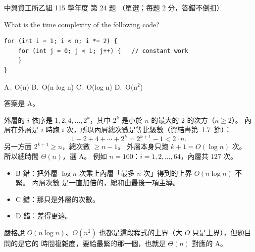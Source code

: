 \begin{pastexam}[label={px:nchu-115-is-24}]{中興資工所乙組 115 學年度 第 24 題}
（單選；每題 2 分，答錯不倒扣）

What is the time complexity of the following code?
\begin{verbatim}
for (int i = 1; i < n; i *= 2) {
    for (int j = 0; j < i; j++) {   // constant work
    }
}
\end{verbatim}
A.~O(n) \qquad B.~O(n log n) \qquad C.~O(log n) \qquad D.~O(n$^2$)
\end{pastexam}

\begin{pastsoln}
答案是 A。

外層的 $i$ 依序是 $1, 2, 4, \ldots, 2^k$，其中 $2^k$ 是小於 $n$ 的最大的 $2$ 的次方（$n \ge 2$）。
內層在外層是 $i$ 時跑 $i$ 次，所以內層總次數是等比級數（資結書第~1.7~節）：
\[
1 + 2 + 4 + \cdots + 2^k = 2^{k+1} - 1 < 2 \cdot n.
\]
另一方面 $2^{k+1} \ge n$，總次數 $\ge n - 1$。 外層本身只跑 $k + 1 = O(\log n)$ 次。 所以總時間
$\Theta(n)$，選 A。 例如 $n = 100$：$i = 1, 2, \ldots, 64$，內層共 $127$ 次。
\begin{itemize}
\item B 錯：把外層 $\log n$ 次乘上內層「最多 $n$ 次」得到的上界 $O(n \log n)$ 不緊。 內層次數
是一直加倍的，總和由最後一項主導。
\item C 錯：那只是外層的次數。
\item D 錯：差得更遠。
\end{itemize}
嚴格說 $O(n \log n)$、$O(n^2)$ 也都是這段程式的上界（大 $O$ 只是上界），但題目問的是它的
時間複雜度，要給最緊的那一個，也就是 $\Theta(n)$ 對應的 A。
\end{pastsoln}
